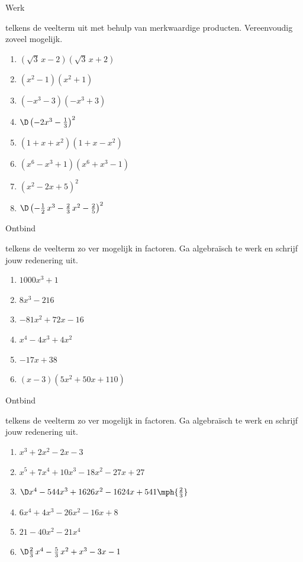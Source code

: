 \documentclass{ximera}
\begin{document}
\begin{Oefening}\setcounter{enumi}{2}
\hypertarget{oef4.2}{Werk} telkens de veelterm uit met behulp van merkwaardige producten. Vereenvoudig zoveel mogelijk. 
\begin{multicols}{2}
\begin{enumerate}

\item
$(\sqrt{3}\,x-2)(\sqrt{3}\,x+2)$
\item
$(x^2-1)(x^2+1)$
\item
$(-x^3-3)(-x^3+3)$
\item
$\D \left(-2x^3-\frac{1}{3}\right)^2$
\item
$(1+x+x^2)(1+x-x^2)$
\item
$(x^6-x^3+1)(x^6+x^3-1)$
\item
$(x^2-2x+5)^2$
\item
$\D \left(-\frac{1}{2}\,x^3 - \frac{2}{3}\,x^2-\frac{2}{5}\right)^2$
\end{enumerate}
\end{multicols}
\end{Oefening}

\begin{Oefening}\setcounter{enumi}{3} 
\hypertarget{oef4.3}{Ontbind} telkens de veelterm zo ver mogelijk in factoren. Ga algebra\"isch te werk en schrijf jouw redenering uit.  
\begin{multicols}{2}
\begin{enumerate}

\item
$1000 x^3 + 1$
\item
$8x^3-216$
\item
$-81x^2+72x-16$
\item
$x^4-4x^3+4x^2$
\item
$-17x+38$
\item
$(x-3)(5x^2+50x+110)$
\end{enumerate}
\end{multicols}
\end{Oefening}

\begin{Oefening}\setcounter{enumi}{4}
\hypertarget{oef4.4}{Ontbind} telkens de veelterm zo ver mogelijk in factoren. Ga algebra\"isch te werk en schrijf jouw redenering uit.  
\begin{multicols}{2}
\begin{enumerate}

\item
$x^3+2x^2-2x-3$
\item
$x^5+7x^4+10x^3-18x^2-27x+27$
\item 
$\D x^4-544x^3+1626x^2-1624x+541 \mph{\frac{2}{3}}$
\item
$6x^4 + 4x^3 - 26x^2 - 16x + 8$
\item
$21-40x^2-21x^4$
\item
$\D \frac{2}{3}\,x^4-\frac{5}{3}\,x^2 + x^3 - 3x-1$
\end{enumerate}
\end{multicols}
\end{Oefening}
\end{document}
